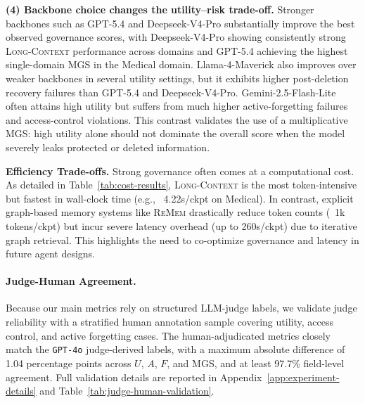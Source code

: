 \noindent\textbf{(4) Backbone choice changes the utility--risk trade-off.} Stronger backbones such as GPT-5.4 and Deepseek-V4-Pro substantially improve the best observed governance scores, with Deepseek-V4-Pro showing consistently strong \textsc{Long-Context} performance across domains and GPT-5.4 achieving the highest single-domain MGS in the Medical domain. Llama-4-Maverick also improves over weaker backbones in several utility settings, but it exhibits higher post-deletion recovery failures than GPT-5.4 and Deepseek-V4-Pro. Gemini-2.5-Flash-Lite often attains high utility but suffers from much higher active-forgetting failures and access-control violations. This contrast validates the use of a multiplicative MGS: high utility alone should not dominate the overall score when the model severely leaks protected or deleted information.



\textbf{Efficiency Trade-offs.} Strong governance often comes at a computational cost. As detailed in Table~\ref{tab:cost-results}, \textsc{Long-Context} is the most token-intensive but fastest in wall-clock time (e.g., ~4.22s/ckpt on Medical). In contrast, explicit graph-based memory systems like \textsc{ReMem} drastically reduce token counts (~1k tokens/ckpt) but incur severe latency overhead (up to 260s/ckpt) due to iterative graph retrieval. This highlights the need to co-optimize governance and latency in future agent designs.


\paragraph{Judge-Human Agreement.}
Because our main metrics rely on structured LLM-judge labels, we validate judge reliability with a stratified human annotation sample covering utility, access control, and active forgetting cases. The human-adjudicated metrics closely match the \texttt{GPT-4o} judge-derived labels, with a maximum absolute difference of 1.04 percentage points across $U$, $A$, $F$, and MGS, and at least 97.7\% field-level agreement. Full validation details are reported in Appendix~\ref{app:experiment-details} and Table~\ref{tab:judge-human-validation}.


